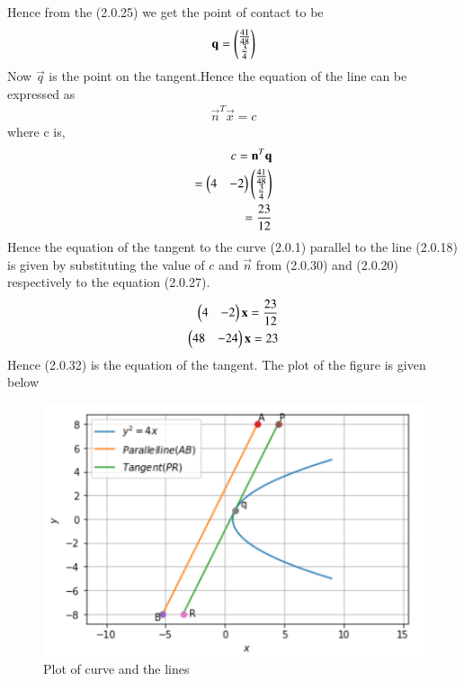 \documentclass[journal,12pt,twocolumn]{IEEEtran}
\begin{document}
Hence from the (2.0.25) we get the point of contact to be 
\begin{align}
    \mathbf{q}=\begin{pmatrix}\frac{41}{48} \\ \frac{3}{4}\end{pmatrix}
\end{align}
Now $\vec{q}$ is the point on the tangent.Hence the equation of the line can be expressed as 
\begin{align}
    \vec{n}^T\vec{x}=c
\end{align}
where c is,
\begin{align}
    c=\mathbf{n}^T\mathbf{q}
    \\
    =\begin{pmatrix}4&-2\end{pmatrix}\begin{pmatrix}\frac{41}{48} \\ \frac{3}{4}\end{pmatrix} 
    \\
    = \frac{23}{12}
\end{align}
Hence the equation of the tangent to the curve (2.0.1) parallel to the line (2.0.18) is given by substituting the value of $c$ and $\vec{n}$ from (2.0.30) and (2.0.20) respectively to the equation (2.0.27). 
\begin{align}
    \begin{pmatrix}4&-2\end{pmatrix}\mathbf{x}=\frac{23}{12}
    \\
    \begin{pmatrix}48&-24\end{pmatrix}\mathbf{x}=23
\end{align}
Hence (2.0.32) is the equation of the tangent.
The plot of the figure is given below

\begin{figure}[ht]
\centering
\includegraphics[width=\columnwidth]{Parabola.PNG}
\caption{Plot of curve and the lines}
\label{Plot of curve and the lines}
\end{figure}
\end{document}
